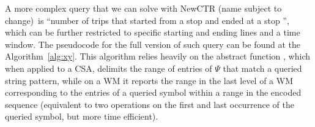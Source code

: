 \documentclass[runningheads]{llncs}
\newcommand{\ctr}{NewCTR (name subject to change)\ }
\begin{document}
\begin{algorithm}[hbt!]
 
 
 \caption{Extracting the trip  from \ctr where ,  and  are structures (i), (ii) and (iii), respectively}
 \label{alg:extract}
\end{algorithm}

A more complex query that we can solve with \ctr is ``number of trips that started from a stop  and ended at a stop '', which can be further restricted to specific starting and ending lines and a time window. The pseudocode for the full version of such query can be found at the Algorithm~\ref{alg:xy}. This algorithm relies heavily on the abstract function , which when applied to a CSA, delimits the range of entries of $\Psi$ that match a queried string pattern, while on a WM it reports the range in the last level of a WM corresponding to the entries of a queried symbol within a range in the encoded sequence (equivalent to two  operations on the first and last occurrence of the queried symbol, but more time efficient).
\end{document}
